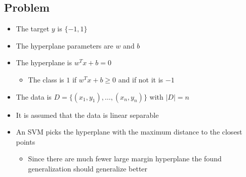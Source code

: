 \documentclass[a4, english]{article}
\begin{document}
\subsection{Problem}
\begin{itemize}
	\item The target $y$ is $\{-1,1\}$ 
  \item The hyperplane parameters are $w$ and $b$ 
  \item The hyperplane is $w^Tx+b=0$ 
  \begin{itemize}
  	\item The class is $1$ if $w^Tx+b \geq 0$ and if not it is $-1$ 
  \end{itemize}
  \item The data is $D=\{(x_1,y_1), \dots, (x_n,y_n)\}$ with $|D| = n$
  \item It is assumed that the data is linear separable 
  \item An SVM picks the hyperplane with the maximum distance to the closest points 
  \begin{itemize}
  	\item Since there are much fewer large margin hyperplane the found generalization should generalize better  
  \end{itemize}
\end{itemize}
\end{document}
